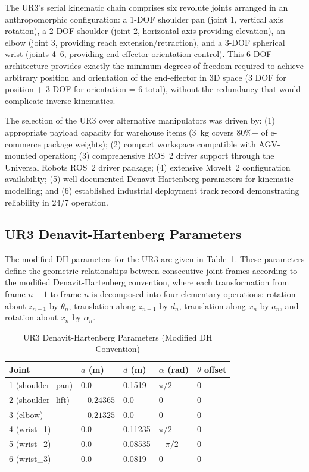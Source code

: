 \documentclass[12pt,a4paper,oneside]{report}
\begin{document}
The UR3's serial kinematic chain comprises six revolute joints arranged in an anthropomorphic configuration: a 1-DOF shoulder pan (joint 1, vertical axis rotation), a 2-DOF shoulder (joint 2, horizontal axis providing elevation), an elbow (joint 3, providing reach extension/retraction), and a 3-DOF spherical wrist (joints 4--6, providing end-effector orientation control). This 6-DOF architecture provides exactly the minimum degrees of freedom required to achieve arbitrary position and orientation of the end-effector in 3D space (3 DOF for position + 3 DOF for orientation = 6 total), without the redundancy that would complicate inverse kinematics.

The selection of the UR3 over alternative manipulators was driven by: (1) appropriate payload capacity for warehouse items (3~kg covers 80\%+ of e-commerce package weights); (2) compact workspace compatible with AGV-mounted operation; (3) comprehensive ROS~2 driver support through the Universal Robots ROS~2 driver package; (4) extensive MoveIt~2 configuration availability; (5) well-documented Denavit-Hartenberg parameters for kinematic modelling; and (6) established industrial deployment track record demonstrating reliability in 24/7 operation.

\subsection{UR3 Denavit-Hartenberg Parameters}

The modified DH parameters for the UR3 are given in Table~\ref{tab:dh}. These parameters define the geometric relationships between consecutive joint frames according to the modified Denavit-Hartenberg convention, where each transformation from frame $n-1$ to frame $n$ is decomposed into four elementary operations: rotation about $z_{n-1}$ by $\theta_n$, translation along $z_{n-1}$ by $d_n$, translation along $x_n$ by $a_n$, and rotation about $x_n$ by $\alpha_n$.

\begin{table}[H]
\centering
\caption{UR3 Denavit-Hartenberg Parameters (Modified DH Convention)}
\label{tab:dh}
\begin{tabular}{p{4cm} p{2cm} p{2cm} p{2cm} p{2cm}}
\toprule
\textbf{Joint} & \textbf{$a$ (m)} & \textbf{$d$ (m)} & \textbf{$\alpha$ (rad)} & \textbf{$\theta$ offset} \\
\midrule
1 (shoulder\_pan) & 0.0 & 0.1519 & $\pi/2$ & 0 \\
2 (shoulder\_lift) & $-0.24365$ & 0.0 & 0 & 0 \\
3 (elbow) & $-0.21325$ & 0.0 & 0 & 0 \\
4 (wrist\_1) & 0.0 & 0.11235 & $\pi/2$ & 0 \\
5 (wrist\_2) & 0.0 & 0.08535 & $-\pi/2$ & 0 \\
6 (wrist\_3) & 0.0 & 0.0819 & 0 & 0 \\
\bottomrule
\end{tabular}
\end{table}
\end{document}
